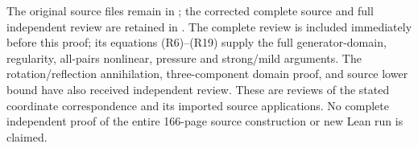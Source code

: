 The original source files remain in
; the corrected complete
source and full independent review are retained in
.
The complete review is included immediately before this proof;
its equations (R6)--(R19) supply the full generator-domain,
regularity, all-pairs nonlinear, pressure and strong/mild arguments.
The rotation/reflection annihilation, three-component domain proof,
and source lower bound have also received independent review.
These are reviews of the stated coordinate correspondence and
its imported source applications. No complete independent proof
of the entire 166-page source construction or new Lean run is claimed.
